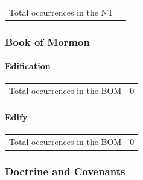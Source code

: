 				\begin{tabular}{ll}
					Total occurrences in the NT & 
				\end{tabular}
				
				\begin{compactdesc}
					\item[Some NT uses] \textbf{}
						\begin{compactdesc}
							\item[{\hyperref[1TIMOTHY-1-4]{1 Timothy 1:4}}]
						\end{compactdesc}
				\end{compactdesc}
				
		
	\subsubsection{Book of Mormon} %
		\label{EDIFICATION-BOM}
		
		\paragraph{Edification}
	
			\begin{tabular}{ll}
				Total occurrences in the BOM & 0
			\end{tabular}
			
			
		\paragraph{Edify}
	
			\begin{tabular}{ll}
				Total occurrences in the BOM & 0
			\end{tabular}
			
		
	\subsubsection{Doctrine and Covenants} %
		\label{EDIFICATION-DC}
	
